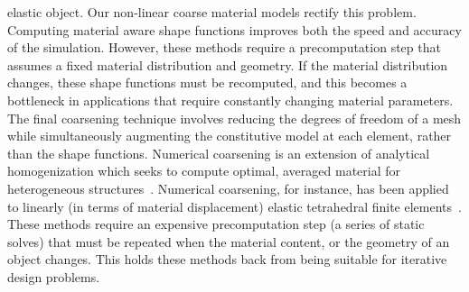 elastic object.
Our non-linear coarse material models rectify this problem.
Computing material aware shape functions improves both the speed
and accuracy of the simulation. However, these methods require a
precomputation step that assumes a fixed material distribution and geometry.
If the material distribution changes, these shape functions
must be recomputed, and this becomes a bottleneck in applications
that require constantly changing material parameters.
The final coarsening technique involves reducing the degrees of freedom
of a mesh while simultaneously augmenting the constitutive
model at each element, rather than the shape functions.
Numerical coarsening is an extension of analytical homogenization which seeks
to compute optimal,
averaged material for heterogeneous structures~\citep{Guedes1990,farmer2002}.
Numerical coarsening, for instance, has been applied to linearly
(in terms of material displacement)
elastic tetrahedral finite elements~\citep{Kharevych2009}.
These methods require an expensive precomputation step (a series
of static solves) that must be repeated when the material content, or
the geometry of an object changes.
This holds these methods back from being suitable for iterative design problems.
